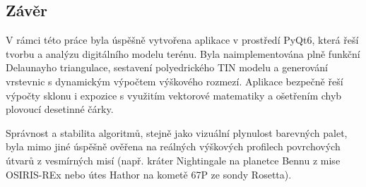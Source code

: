 \subsection{Závěr}
V rámci této práce byla úspěšně vytvořena aplikace v prostředí PyQt6, která řeší tvorbu a analýzu digitálního modelu terénu. Byla naimplementována plně funkční Delaunayho triangulace, sestavení polyedrického TIN modelu a generování vrstevnic s dynamickým výpočtem výškového rozmezí. Aplikace bezpečně řeší výpočty sklonu i expozice s využitím vektorové matematiky a ošetřením chyb plovoucí desetinné čárky.

Správnost a stabilita algoritmů, stejně jako vizuální plynulost barevných palet, byla mimo jiné úspěšně ověřena na reálných výškových profilech povrchových útvarů z vesmírných misí (např. kráter Nightingale na planetce Bennu z mise OSIRIS-REx nebo útes Hathor na kometě 67P ze sondy Rosetta).







